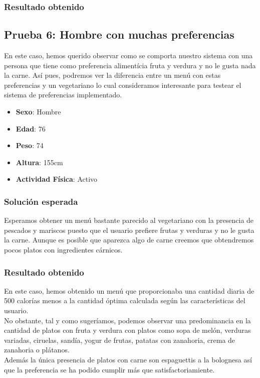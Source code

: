 \documentclass[12]{article}
\begin{document}
\subsubsection{Resultado obtenido}

\subsection{Prueba 6: Hombre con muchas preferencias}
En este caso, hemos querido observar como se comporta nuestro sistema con una persona que tiene como preferencia alimentícia fruta y verdura y no le gusta nada la carne. Así pues, podremos ver la diferencia entre un menú con estas preferencias y un vegetariano lo cual consideramos interesante para testear el sistema de preferencias implementado. 

\begin{itemize}
\item \textbf{Sexo}: Hombre
\item \textbf{Edad}: 76
\item \textbf{Peso}: 74
\item \textbf{Altura}: 155cm
\item \textbf{Actividad Física}: Activo
\end{itemize}
\subsubsection{Solución esperada}
Esperamos obtener un menú bastante parecido al vegetariano con la presencia de pescados y mariscos puesto que el usuario prefiere frutas y verduras y no le gusta la carne. Aunque es posible que aparezca algo de carne creemos que obtendremos pocos platos con ingredientes cárnicos. 

\subsubsection{Resultado obtenido}
En este caso, hemos obtenido un menú que proporcionaba una cantidad diaria de 500 calorías menos a la cantidad óptima calculada según las características del usuario. 
\\
No obstante, tal y como sugeríamos, podemos observar una predominancia en la cantidad de platos con fruta y verdura con platos como sopa de melón, verduras variadas, ciruelas, sandía, yogur de frutas, patatas con zanahoria, crema de zanahoria o plátanos. 
\\
Además la única presencia de platos con carne son espaguettis a la bolognesa así que la preferencia se ha podido cumplir más que satisfactoriamiente. 
\end{document}
